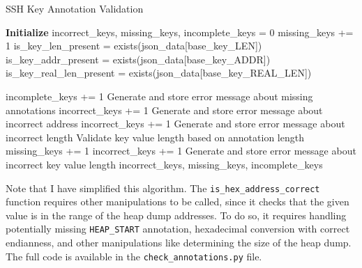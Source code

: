    \begin{algorithm}[H]
        \caption{SSH Key Annotation Validation}
        \begin{algorithmic}[1]
            \State \textbf{Initialize} incorrect\_keys, missing\_keys, incomplete\_keys = 0
                \State missing\_keys += 1 
            \Else
                \State is\_key\_len\_present = exists(json\_data[base\_key\_LEN])
                \State is\_key\_addr\_present = exists(json\_data[base\_key\_ADDR])
                \State is\_key\_real\_len\_present = exists(json\_data[base\_key\_REAL\_LEN])
                
                    \State incomplete\_keys += 1 
                    \State Generate and store error message about missing annotations
                    \State incorrect\_keys += 1 
                    \State Generate and store error message about incorrect address
                    \State incorrect\_keys += 1 
                    \State Generate and store error message about incorrect length
                \Else
                    \State Validate key value length based on annotation length
                        \State missing\_keys += 1 
                        \State incorrect\_keys += 1 
                        \State Generate and store error message about incorrect key value length
                    \EndIf
                \EndIf
            \EndIf
            \State \Return incorrect\_keys, missing\_keys, incomplete\_keys
        \EndProcedure
        \end{algorithmic}
    \end{algorithm}

    Note that I have simplified this algorithm. The \texttt{is\_hex\_address\_correct} function requires other manipulations to be called, since it checks that the given value is in the range of the heap dump addresses. To do so, it requires handling potentially missing \texttt{HEAP\_START} annotation, hexadecimal conversion with correct endianness, and other manipulations like determining the size of the heap dump. The full code is available in the \texttt{check\_annotations.py} file.

